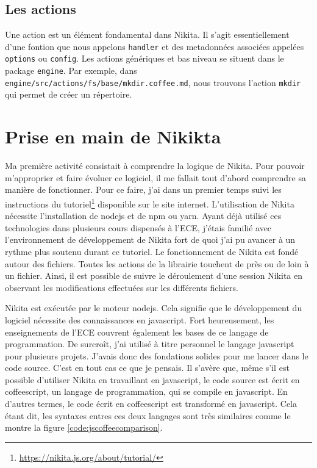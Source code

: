 \documentclass[12pt, french]{report}
\begin{document}
\subsection{Les actions}

Une action est un élément fondamental dans Nikita. Il s'agit essentiellement d'une fontion que nous appelons \texttt{handler} et des metadonnées associées appelées \texttt{options} ou \texttt{config}. Les actions génériques et bas niveau se situent dans le package \texttt{engine}. Par exemple, dans \texttt{engine/src/actions/fs/base/mkdir.coffee.md}, nous trouvons l'action \texttt{mkdir} qui permet de créer un répertoire.

\section{Prise en main de Nikikta}

Ma première activité consistait à comprendre la logique de Nikita. Pour pouvoir m'approprier et faire évoluer ce logiciel, il me fallait tout d'abord comprendre sa manière de fonctionner. Pour ce faire, j'ai dans un premier temps suivi les instructions du tutoriel\footnote{\href{https://nikita.js.org/about/tutorial/}{https://nikita.js.org/about/tutorial/}} disponible sur le site internet. L'utilisation de Nikita nécessite l'installation de \gls{nodejs} et de \gls{npm} ou \gls{yarn}. Ayant déjà utilisé ces technologies dans plusieurs cours dispensés à l'ECE, j'étais familié avec l'environnement de développement de Nikita fort de quoi j'ai pu avancer à un rythme plus soutenu durant ce tutoriel. Le fonctionnement de Nikita est fondé autour des fichiers. Toutes les actions de la librairie touchent de près ou de loin à un fichier. Ainsi, il est possible de suivre le déroulement d'une session Nikita en observant les modifications effectuées sur les différents fichiers.

Nikita est exécutée par le moteur \gls{nodejs}. Cela signifie que le développement du logiciel nécessite des connaissances en \gls{javascript}. Fort heureusement, les enseignements de l'ECE couvrent également les bases de ce langage de programmation. De surcroît, j'ai utilisé à titre personnel le langage \gls{javascript} pour plusieurs projets. J'avais donc des fondations solides pour me lancer dans le code source. C'est en tout cas ce que je pensais. Il s'avère que, même s'il est possible d'utiliser Nikita en travaillant en \gls{javascript}, le code source est écrit en \gls{coffeescript}, un langage de programmation, qui se compile en \gls{javascript}. En d'autres termes, le code écrit en \gls{coffeescript} est transformé en \gls{javascript}. Cela étant dit, les syntaxes entres ces deux langages sont très similaires comme le montre la figure \ref{code:jscoffeecomparison}.
\end{document}
